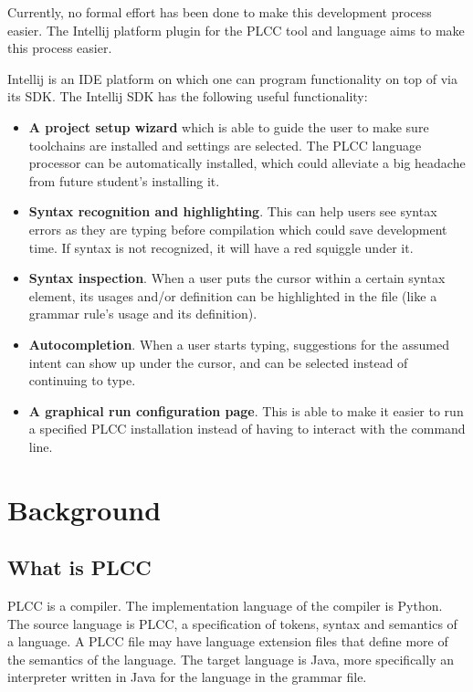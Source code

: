 \documentclass[conference, letterpaper]{IEEEtran}
\begin{document}
Currently, no formal effort has been done to make this development process easier.
The Intellij platform plugin for the PLCC tool and language aims to make this process easier.
\par Intellij is an IDE platform on which one can program functionality on top of via its SDK\@.
The Intellij SDK has the following useful functionality:
\begin{itemize}
    \item \textbf{A project setup wizard} which is able to guide the user to make sure toolchains are installed and settings are selected.
    The PLCC language processor can be automatically installed, which could alleviate a big headache from future student's installing it.
    \item \textbf{Syntax recognition and highlighting}.
    This can help users see syntax errors as they are typing before compilation which could save development time.
    If syntax is not recognized, it will have a red squiggle under it.
    \item \textbf{Syntax inspection}.
    When a user puts the cursor within a certain syntax element, its usages and/or definition can be highlighted in the file (like a grammar rule's usage and its definition).
    \item \textbf{Autocompletion}.
    When a user starts typing, suggestions for the assumed intent can show up under the cursor, and can be selected instead of continuing to type.
    \item \textbf{A graphical run configuration page}.
    This is able to make it easier to run a specified PLCC installation instead of having to interact with the command line.
\end{itemize}


\section{Background}\label{sec:background}
\subsection{What is PLCC}\label{subsec:what-is-plcc}
PLCC is a compiler.
The implementation language of the compiler is Python.
The source language is PLCC, a specification of tokens, syntax and semantics of a language.
A PLCC file may have language extension files that define more of the semantics of the language.
The target language is Java, more specifically an interpreter written in Java for the language in the grammar file.
\end{document}
